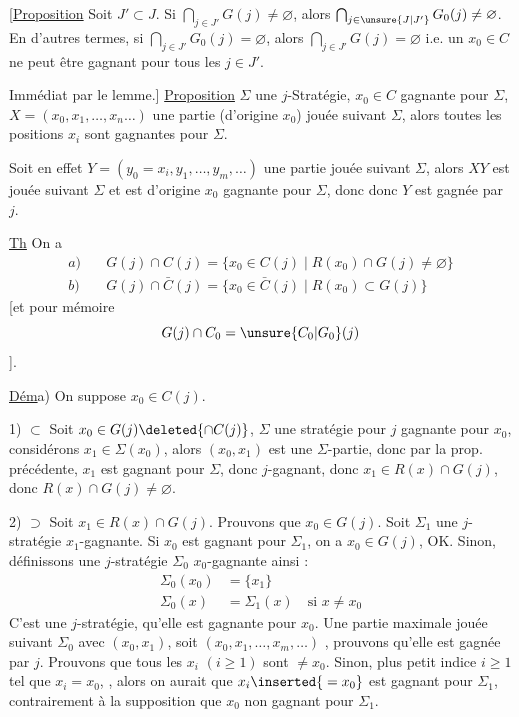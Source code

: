[\uline{Proposition} Soit $J'\subset J$. Si $\bigcap_{j\in J'}G(j)\ne\varnothing$, alors $\bigcap_{j\in\unsure{J|J'}}G_0(j)\ne\varnothing$. En d'autres termes, si $\bigcap_{j\in J'}G_0(j)=\varnothing$, alors $\bigcap_{j\in J'}G(j)=\varnothing$ i.e. un $x_0\in C$ ne peut être gagnant pour tous les $j\in J'$.

Immédiat par le lemme.]
\uline{Proposition}\quad {} $\Sigma$ une $j$-Stratégie, $x_0\in C$  gagnante pour $\Sigma$, $X=(x_0,x_1,\ldots,x_n\ldots)$ une partie (d'origine $x_0$) jouée suivant $\Sigma$, alors toutes les positions $x_i$ sont gagnantes pour $\Sigma$.

Soit en effet $Y=(y_0=x_i,y_1,\ldots,y_m,\ldots)$ une partie  jouée suivant $\Sigma$,  alors $XY$ est jouée suivant $\Sigma$ et est d'origine $x_0$ gagnante pour $\Sigma$, donc  donc $Y$ est gagnée par $j$.

\uline{Th} On a 
\[
\begin{aligned}
a)\quad&G(j)\cap C(j)=\{x_0\in C(j)\mid R(x_0)\cap G(j)\ne\varnothing\}\\
b)\quad&G(j)\cap\bar C(j)=\{x_0\in\bar C(j)\mid R(x_0)\subset G(j)\}
\end{aligned}
\]
[et pour mémoire
\[
G(j)\cap C_0=\unsure{C_0|G_0}(j)
\]
].

\uline{Dém}\quad a) On suppose $x_0\in C(j)$.

 1) $\subset$ Soit $x_0\in G(j)\deleted{\cap C(j)}$,  $\Sigma$ une stratégie pour $j$ gagnante pour $x_0$, considérons $x_1\in\Sigma(x_0)$, alors $(x_0,x_1)$ est une $\Sigma$-partie, donc par la prop. précédente, $x_1$ est gagnant pour $\Sigma$, donc $j$-gagnant, donc $x_1\in R(x)\cap G(j)$, donc $R(x)\cap G(j)\ne\varnothing$.

2) $\supset$ Soit $x_1\in R(x)\cap G(j)$. Prouvons que $x_0\in G(j)$.  Soit $\Sigma_1$ une $j$-stratégie $x_1$-gagnante. Si $x_0$ est gagnant pour $\Sigma_1$, on a $x_0\in G(j)$, OK. Sinon, définissons une $j$-stratégie $\Sigma_0$ $x_0$-gagnante ainsi :
\[
\begin{aligned}
\Sigma_0(x_0)&=\{x_1\}\\
\Sigma_0(x)&=\Sigma_1(x)\quad\text{si }x\ne x_0
\end{aligned}
\]
C'est une $j$-stratégie,   qu'elle est gagnante pour $x_0$.  Une partie maximale jouée suivant $\Sigma_0$  avec $(x_0,x_1)$, soit $(x_0,x_1,\ldots,x_m,\ldots)$ , prouvons qu'elle est gagnée par $j$. Prouvons que tous les $x_i$ $(i\geq1)$ sont $\ne x_0$. Sinon,  plus petit indice $i\geq1$ tel que $x_i=x_0$, , alors   on aurait que $x_i\inserted{{}=x_0}$ est gagnant pour $\Sigma_1$, contrairement à la supposition que $x_0$ non gagnant pour $\Sigma_1$.

